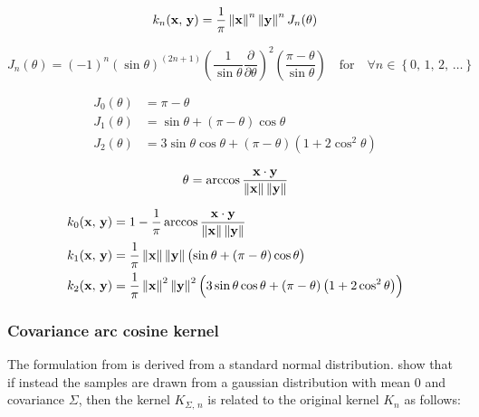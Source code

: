 \begin{equation}\label{eq:kernel_cho}
	k_n(\mathbf{x},\,\mathbf{y}) = \frac{1}{\pi} \left\lVert \mathbf{x} \right\rVert^n \left\lVert \mathbf{y} \right\rVert^n J_n(\theta)
\end{equation}

\begin{equation}
	J_n(\theta) = (-1)^n \left( \sin \theta \right)^{(2n+1)}
	\left( \frac{1}{\sin \theta} \frac{\partial}{\partial \theta} \right)^2
	\left( \frac{\pi - \theta}{\sin \theta} \right)
	\quad \text{for} \quad \forall n \in \left\{ 0,\,1,\,2,\,\dots \right\}
\end{equation}

\begin{align}
	J_0(\theta) & = \pi - \theta                                                                    \\
	J_1(\theta) & = \sin\theta + \left(\pi - \theta\right)\cos\theta                                \\
	J_2(\theta) & = 3\sin\theta\cos\theta + \left(\pi - \theta\right)\left(1 + 2\cos^2\theta\right)
\end{align}

\begin{equation}
	\theta = \arccos\frac{\mathbf{x} \cdot \mathbf{y}}{\left\lVert \mathbf{x} \right\rVert \left\lVert \mathbf{y} \right\rVert}
\end{equation}


\begin{align}
	k_0(\mathbf{x},\,\mathbf{y}) & = 1 - \frac{1}{\pi} \arccos\frac{\mathbf{x} \cdot \mathbf{y}}{\left\lVert \mathbf{x} \right\rVert \left\lVert \mathbf{y} \right\rVert} \\
	k_1(\mathbf{x},\,\mathbf{y}) & = \frac{1}{\pi} \left\lVert \mathbf{x} \right\rVert \left\lVert \mathbf{y} \right\rVert
	\bigl( \sin\theta + \left(\pi - \theta\right)\cos\theta \bigr)                                                        \\
	k_2(\mathbf{x},\,\mathbf{y}) & = \frac{1}{\pi} \left\lVert \mathbf{x} \right\rVert^2 \left\lVert \mathbf{y} \right\rVert^2
	\Bigl( 3\sin\theta\cos\theta + \left(\pi - \theta\right)\left(1 + 2\cos^2\theta\right) \Bigr)
\end{align}

\subsubsection{Covariance arc cosine kernel}

The formulation from \textcite{choLargemarginClassificationInfinite2010} is derived from a standard normal
distribution. \Textcite{pandeyGoDeepWide2014} show that if instead the samples are drawn from a gaussian
distribution with mean 0 and covariance $\Sigma$, then the kernel $K_{\Sigma,\,n}$ is related to the
original kernel $K_{n}$ as follows:

